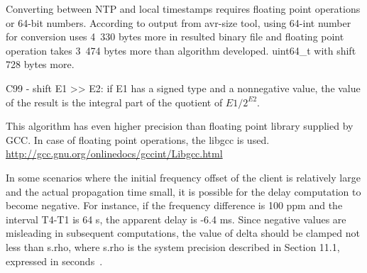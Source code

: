 Converting between NTP and local timestamps requires floating point operations or 64-bit numbers.
According to output from avr-size tool, using 64-int number for conversion
uses 4~330 bytes more in %
resulted binary file 
and floating point operation takes 3~474 bytes more
than algorithm developed.
uint64\_t with shift 728 bytes more.

C99 - shift E1 >> E2: if E1 has a signed type and a nonnegative value, the value of
the result is the integral part of the quotient of $E1 / 2^{E2}$.

This algorithm has even higher precision than floating point library
supplied by GCC.
In case of floating point operations, the libgcc is used.
\url{http://gcc.gnu.org/onlinedocs/gccint/Libgcc.html}

%
In some scenarios where the initial frequency offset of the client is
  relatively large and the actual propagation time small, it is
   possible for the delay computation to become negative.  For instance,
   if the frequency difference is 100 ppm and the interval T4-T1 is 64
   s, the apparent delay is -6.4 ms.  Since negative values are
   misleading in subsequent computations, the value of delta should be
   clamped not less than s.rho, where s.rho is the system precision
   described in Section 11.1, expressed in seconds~\cite{rfc5905}.
%

